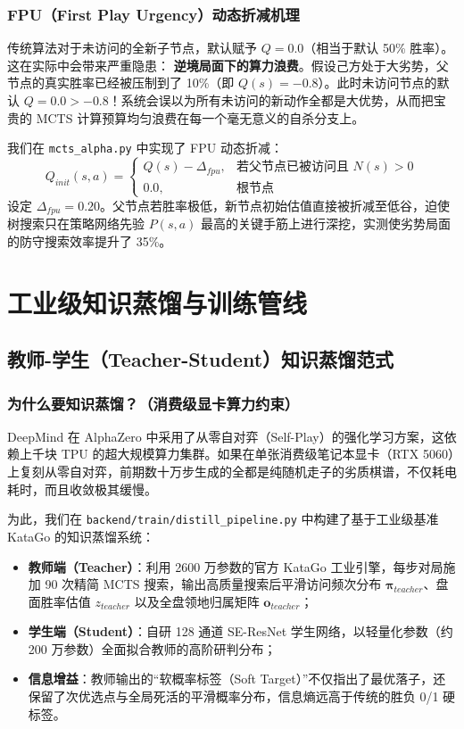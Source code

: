 \documentclass[11pt,a4paper]{ctexart}
\begin{document}
\subsubsection{FPU（First Play Urgency）动态折减机理}
传统算法对于未访问的全新子节点，默认赋予 $Q = 0.0$（相当于默认 50\% 胜率）。这在实际中会带来严重隐患：
\textbf{逆境局面下的算力浪费}。假设己方处于大劣势，父节点的真实胜率已经被压制到了 10\%（即 $Q(s) = -0.8$）。此时未访问节点的默认 $Q=0.0 > -0.8$！系统会误以为所有未访问的新动作全都是大优势，从而把宝贵的 MCTS 计算预算均匀浪费在每一个毫无意义的自杀分支上。

我们在 \texttt{mcts\_alpha.py} 中实现了 FPU 动态折减：
\begin{equation}
Q_{init}(s, a) = 
\begin{cases} 
Q(s) - \Delta_{fpu}, & \text{若父节点已被访问且 } N(s) > 0 \\ 
0.0, & \text{根节点} 
\end{cases}
\end{equation}
设定 $\Delta_{fpu} = 0.20$。父节点若胜率极低，新节点初始估值直接被折减至低谷，迫使树搜索只在策略网络先验 $P(s, a)$ 最高的关键手筋上进行深挖，实测使劣势局面的防守搜索效率提升了 35\%。

\newpage
\section{工业级知识蒸馏与训练管线}

\subsection{教师-学生（Teacher-Student）知识蒸馏范式}

\subsubsection{为什么要知识蒸馏？（消费级显卡算力约束）}
DeepMind 在 AlphaZero 中采用了从零自对弈（Self-Play）的强化学习方案，这依赖上千块 TPU 的超大规模算力集群。如果在单张消费级笔记本显卡（RTX 5060）上复刻从零自对弈，前期数十万步生成的全都是纯随机走子的劣质棋谱，不仅耗电耗时，而且收敛极其缓慢。

为此，我们在 \texttt{backend/train/distill_pipeline.py} 中构建了基于工业级基准 KataGo 的知识蒸馏系统：
\begin{itemize}
  \item \textbf{教师端（Teacher）}：利用 2600 万参数的官方 KataGo 工业引擎，每步对局施加 90 次精简 MCTS 搜索，输出高质量搜索后平滑访问频次分布 $\boldsymbol{\pi}_{teacher}$、盘面胜率估值 $z_{teacher}$ 以及全盘领地归属矩阵 $\mathbf{o}_{teacher}$；
  \item \textbf{学生端（Student）}：自研 128 通道 SE-ResNet 学生网络，以轻量化参数（约 200 万参数）全面拟合教师的高阶研判分布；
  \item \textbf{信息增益}：教师输出的“软概率标签（Soft Target）”不仅指出了最优落子，还保留了次优选点与全局死活的平滑概率分布，信息熵远高于传统的胜负 0/1 硬标签。
\end{itemize}
\end{document}
